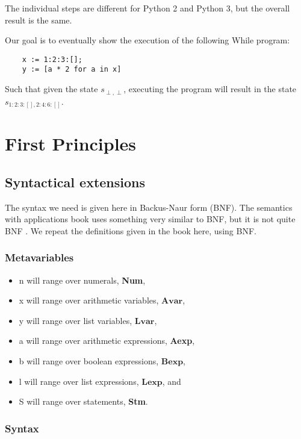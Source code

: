 \documentclass[12pt]{article}
\newcommand{\metavar}[1]{\textlangle#1\textrangle}
\newcommand{\Avar}{\mathbf{Avar}}
\newcommand{\Lvar}{\mathbf{Lvar}}
\newcommand{\Bexp}{\mathbf{Bexp}}
\newcommand{\Lexp}{\mathbf{Lexp}}
\begin{document}
The individual steps are different for Python 2 and Python 3, but the overall result is the same.

Our goal is to eventually show the execution of the following While program:

\begin{lstlisting}
    x := 1:2:3:[];
    y := [a * 2 for a in x]
\end{lstlisting}

Such that given the state $s_{\perp, \perp}$, executing the program will result in the state $s_{1:2:3:[], 2:4:6:[]}$.

\section{First Principles}

\subsection{Syntactical extensions}

The syntax we need is given here in Backus-Naur form (BNF). The semantics with applications book uses something very similar to BNF, but it is not quite BNF \cite[section 1.2]{wiley}. We repeat the definitions given in the book here, using BNF.

\subsubsection{Metavariables}

\begin{itemize}
    \item \metavar{n} will range over numerals, \textbf{Num},
    \item \metavar{x} will range over arithmetic variables, $\Avar$,
    \item \metavar{y} will range over list variables, $\Lvar$,
    \item \metavar{a} will range over arithmetic expressions, \textbf{Aexp},
    \item \metavar{b} will range over boolean expressions, $\Bexp$,
    \item \metavar{l} will range over list expressions, $\Lexp$, and
    \item \metavar{S} will range over statements, \textbf{Stm}.
\end{itemize}

\subsubsection{Syntax}
\end{document}
